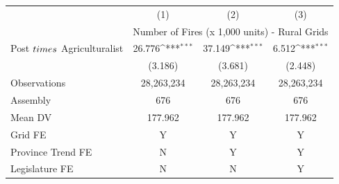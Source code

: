 {
\def\sym#1{\ifmmode^{#1}\else\(^{#1}\)\fi}
\begin{tabular}{l*{3}{c}}
\hline
            &\multicolumn{1}{c}{(1)}         &\multicolumn{1}{c}{(2)}         &\multicolumn{1}{c}{(3)}         \\
            & \multicolumn{3}{c}{Number of Fires (x 1,000 units) - Rural Grids} \\ \hline

Post $\\times$ Agriculturalist&      26.776\sym{***}&      37.149\sym{***}&       6.512\sym{***}\\
            &     (3.186)         &     (3.681)         &     (2.448)         \\
\hline
Observations&  28,263,234         &  28,263,234         &  28,263,234         \\
Assembly    &         676         &         676         &         676         \\
Mean DV     &     177.962         &     177.962         &     177.962         \\
Grid FE     &           Y         &           Y         &           Y         \\
Province Trend FE&           N         &           Y         &           Y         \\
Legislature FE&           N         &           N         &           Y         \\
\hline
\end{tabular}
}

